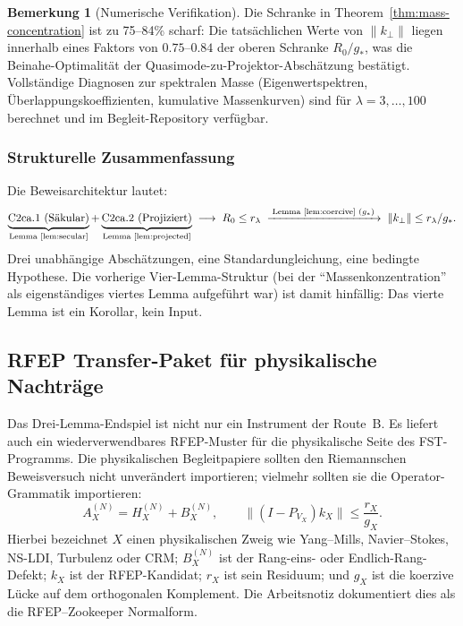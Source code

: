 \documentclass[11pt,a4paper]{article}
\theoremstyle{plain}
\theoremstyle{definition}
\newtheorem{remark}[theorem]{Bemerkung}
\begin{document}
\begin{remark}[Numerische Verifikation]
Die Schranke in Theorem~\ref{thm:mass-concentration} ist zu 75--84\% scharf:
Die tatsächlichen Werte von $\|k_\perp\|$ liegen innerhalb eines Faktors
von $0.75$--$0.84$ der oberen Schranke $R_0/g_*$, was die Beinahe-Optimalität
der Quasimode-zu-Projektor-Abschätzung bestätigt. Vollständige Diagnosen
zur spektralen Masse (Eigenwertspektren, Überlappungskoeffizienten, kumulative
Massenkurven) sind für $\lambda = 3, \ldots, 100$ berechnet und im Begleit-Repository
verfügbar.
\end{remark}

\subsubsection{Strukturelle Zusammenfassung}

Die Beweisarchitektur lautet:
\[
\underbrace{\text{C2ca.1 (Säkular)}}_{\text{Lemma~\ref{lem:secular}}}
+ \underbrace{\text{C2ca.2 (Projiziert)}}_{\text{Lemma~\ref{lem:projected}}}
\;\longrightarrow\; R_0 \leq r_\lambda
\;\xrightarrow{\;\text{Lemma~\ref{lem:coercive} } (g_*)\;}
\;\|k_\perp\| \leq r_\lambda / g_*.
\]
Drei unabhängige Abschätzungen, eine Standardungleichung, eine bedingte
Hypothese. Die vorherige Vier-Lemma-Struktur (bei der ``Massenkonzentration''
als eigenständiges viertes Lemma aufgeführt war) ist damit hinfällig:
Das vierte Lemma ist ein Korollar, kein Input.

\subsection{RFEP Transfer-Paket für physikalische Nachträge}
\label{sec:rfep-physics-transfer}

Das Drei-Lemma-Endspiel ist nicht nur ein Instrument der Route~B. Es liefert
auch ein wiederverwendbares RFEP-Muster für die physikalische Seite des
FST-Programms. Die physikalischen Begleitpapiere sollten den Riemannschen
Beweisversuch nicht unverändert importieren; vielmehr sollten sie die Operator-Grammatik importieren:
\[
  A_X^{(N)} = H_X^{(N)} + B_X^{(N)}, \qquad
  \|(I-P_{V_X})k_X\| \leq \frac{r_X}{g_X}.
\]
Hierbei bezeichnet $X$ einen physikalischen Zweig wie Yang--Mills,
Navier--Stokes, NS-LDI, Turbulenz oder CRM; $B_X^{(N)}$ ist der
Rang-eins- oder Endlich-Rang-Defekt; $k_X$ ist der RFEP-Kandidat;
$r_X$ ist sein Residuum; und $g_X$ ist die koerzive Lücke auf dem
orthogonalen Komplement. Die Arbeitsnotiz \cite{RFEPTransferNote}
dokumentiert dies als die RFEP--Zookeeper Normalform.
\end{document}

